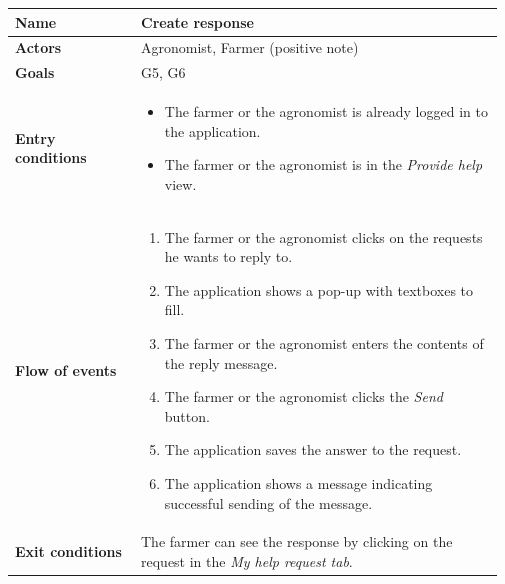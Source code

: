 \begin{table}[H]
    \centering
	\begin{tabular}{@{}p{0.25\linewidth} p{0.72\linewidth}@{}}
\toprule
		\textbf{Name}               & Create response\\
		\midrule
		\textbf{Actors}             & Agronomist, Farmer (positive note)\\
		\midrule
		\textbf{Goals}              & G5, G6 \\
		\midrule
		
		\textbf{Entry conditions}   & \begin{itemize}[leftmargin=.4cm,noitemsep,topsep=0pt,before=\vspace{-3mm},after=\vspace{-4mm}]
		    \item The farmer or the agronomist is already logged in to the application.
		    \item The farmer or the agronomist is in the \textit{Provide help} view.
		\end{itemize}\\
		\midrule
		
		\textbf{Flow of events}     & \begin{enumerate}[leftmargin=.4cm,noitemsep,topsep=0pt,before=\vspace{-3mm},after=\vspace{-4mm}]
		    \item The farmer or the agronomist clicks on the requests he wants to reply to. 
		    \item The application shows a pop-up with textboxes to fill.
		    \item The farmer or the agronomist enters the contents of the reply message.
		    \item The farmer or the agronomist clicks the \textit{Send} button.
		    \item The application saves the answer to the request.
		    \item The application shows a message indicating successful sending of the message.
		\end{enumerate}\\
		\midrule
		\textbf{Exit conditions}    & The farmer can see the response by clicking on the request in the \textit{My help request tab}. \\
		\midrule
		

\end{tabular}
\end{table}
